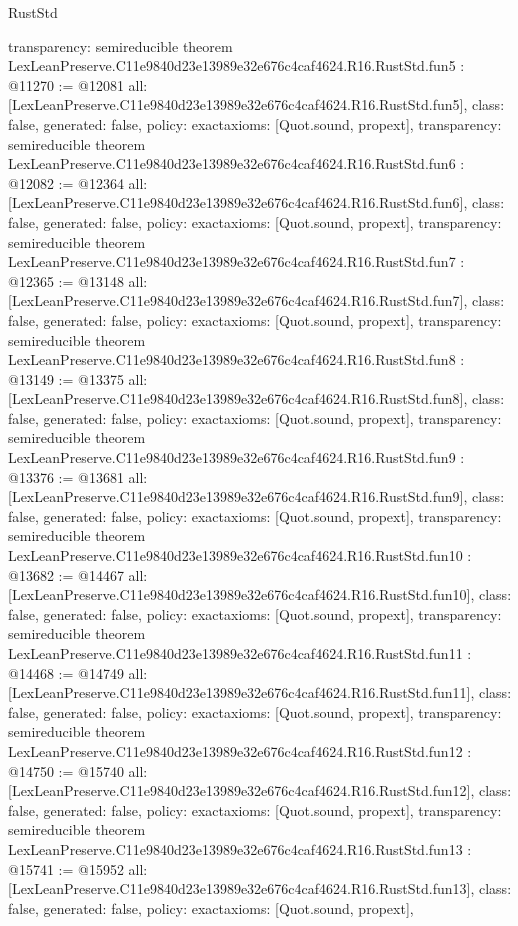 \begin{lexlean}{RustStd}
\begin{coremodule}
{  transparency: semireducible
}
theorem LexLeanPreserve.C11e9840d23e13989e32e676c4caf4624.R16.RustStd.fun5 : @11270 := @12081 {
  all: [LexLeanPreserve.C11e9840d23e13989e32e676c4caf4624.R16.RustStd.fun5],
  class: false,
  generated: false,
  policy: exact{axioms: [Quot.sound, propext]},
  transparency: semireducible
}
theorem LexLeanPreserve.C11e9840d23e13989e32e676c4caf4624.R16.RustStd.fun6 : @12082 := @12364 {
  all: [LexLeanPreserve.C11e9840d23e13989e32e676c4caf4624.R16.RustStd.fun6],
  class: false,
  generated: false,
  policy: exact{axioms: [Quot.sound, propext]},
  transparency: semireducible
}
theorem LexLeanPreserve.C11e9840d23e13989e32e676c4caf4624.R16.RustStd.fun7 : @12365 := @13148 {
  all: [LexLeanPreserve.C11e9840d23e13989e32e676c4caf4624.R16.RustStd.fun7],
  class: false,
  generated: false,
  policy: exact{axioms: [Quot.sound, propext]},
  transparency: semireducible
}
theorem LexLeanPreserve.C11e9840d23e13989e32e676c4caf4624.R16.RustStd.fun8 : @13149 := @13375 {
  all: [LexLeanPreserve.C11e9840d23e13989e32e676c4caf4624.R16.RustStd.fun8],
  class: false,
  generated: false,
  policy: exact{axioms: [Quot.sound, propext]},
  transparency: semireducible
}
theorem LexLeanPreserve.C11e9840d23e13989e32e676c4caf4624.R16.RustStd.fun9 : @13376 := @13681 {
  all: [LexLeanPreserve.C11e9840d23e13989e32e676c4caf4624.R16.RustStd.fun9],
  class: false,
  generated: false,
  policy: exact{axioms: [Quot.sound, propext]},
  transparency: semireducible
}
theorem LexLeanPreserve.C11e9840d23e13989e32e676c4caf4624.R16.RustStd.fun10 : @13682 := @14467 {
  all: [LexLeanPreserve.C11e9840d23e13989e32e676c4caf4624.R16.RustStd.fun10],
  class: false,
  generated: false,
  policy: exact{axioms: [Quot.sound, propext]},
  transparency: semireducible
}
theorem LexLeanPreserve.C11e9840d23e13989e32e676c4caf4624.R16.RustStd.fun11 : @14468 := @14749 {
  all: [LexLeanPreserve.C11e9840d23e13989e32e676c4caf4624.R16.RustStd.fun11],
  class: false,
  generated: false,
  policy: exact{axioms: [Quot.sound, propext]},
  transparency: semireducible
}
theorem LexLeanPreserve.C11e9840d23e13989e32e676c4caf4624.R16.RustStd.fun12 : @14750 := @15740 {
  all: [LexLeanPreserve.C11e9840d23e13989e32e676c4caf4624.R16.RustStd.fun12],
  class: false,
  generated: false,
  policy: exact{axioms: [Quot.sound, propext]},
  transparency: semireducible
}
theorem LexLeanPreserve.C11e9840d23e13989e32e676c4caf4624.R16.RustStd.fun13 : @15741 := @15952 {
  all: [LexLeanPreserve.C11e9840d23e13989e32e676c4caf4624.R16.RustStd.fun13],
  class: false,
  generated: false,
  policy: exact{axioms: [Quot.sound, propext]},
}
\end{coremodule}
\end{lexlean}
